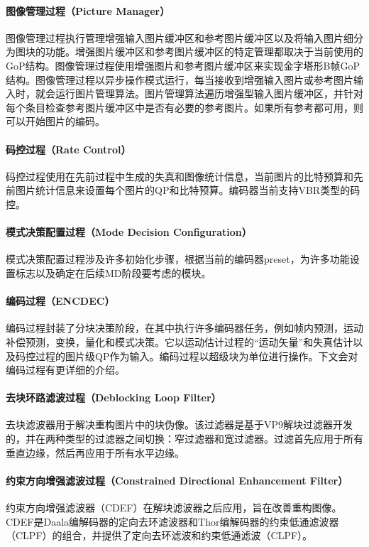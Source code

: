   \paragraph{图像管理过程（Picture Manager）} 图像管理过程执行管理增强输入图片缓冲区和参考图片缓冲区以及将输入图片细分为图块的功能。增强图片缓冲区和参考图片缓冲区的特定管理都取决于当前使用的GoP结构。图像管理过程使用增强图片和参考图片缓冲区来实现金字塔形B帧GoP结构。图像管理过程以异步操作模式运行，每当接收到增强输入图片或参考图片输入时，就会运行图片管理算法。图片管理算法遍历增强型输入图片缓冲区，并针对每个条目检查参考图片缓冲区中是否有必要的参考图片。如果所有参考都可用，则可以开始图片的编码。

  \paragraph{码控过程（Rate Control）} 码控过程使用在先前过程中生成的失真和图像统计信息，当前图片的比特预算和先前图片统计信息来设置每个图片的QP和比特预算。编码器当前支持VBR类型的码控。

  \paragraph{模式决策配置过程（Mode Decision Configuration）} 模式决策配置过程涉及许多初始化步骤，根据当前的编码器preset，为许多功能设置标志以及确定在后续MD阶段要考虑的模块。

  \paragraph{编码过程（ENCDEC）} 编码过程封装了分块决策阶段，在其中执行许多编码器任务，例如帧内预测，​​运动补偿预测，变换，量化和模式决策。它以运动估计过程的“运动矢量”和失真估计以及码控过程的图片级QP作为输入。编码过程以超级块为单位进行操作。下文会对编码过程有更详细的介绍。

  \paragraph{去块环路滤波过程（Deblocking Loop Filter）} 去块滤波器用于解决重构图片中的块伪像。该过滤器是基于VP9解块过滤器开发的，并在两种类型的过滤器之间切换：窄过滤器和宽过滤器。过滤首先应用于所有垂直边缘，然后再应用于所有水平边缘。

  \paragraph{约束方向增强滤波过程（Constrained Directional Enhancement Filter）} 约束方向增强滤波器（CDEF）在解块滤波器之后应用，旨在改善重构图像。CDEF是Daala编解码器的定向去环滤波器和Thor编解码器的约束低通滤波器（CLPF）的组合，并提供了定向去环滤波和约束低通滤波（CLPF）。

